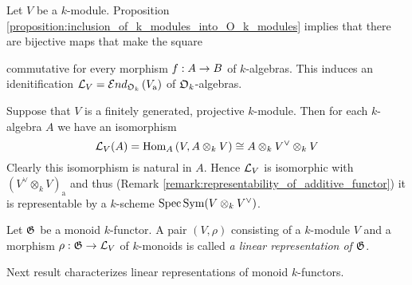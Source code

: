 \begin{remark}\label{remark:general_linear_monoid}
Let $V$ be a $k$-module. Proposition \ref{proposition:inclusion_of_k_modules_into_O_k_modules} implies that there are bijective maps that make the square
\begin{center}
\end{center}
commutative for every morphism $f:A\rightarrow B$ of $k$-algebras. This induces an idenitification ${\mathcal L}_V = {\mathcal E} nd_{{\mathfrak O}_k}\left(V_{\mathrm{a}}\right)$ of ${\mathfrak O}_k$-algebras.
\end{remark}

\begin{remark}\label{remark:representability_of_linear_monoid}
Suppose that $V$ is a finitely generated, projective $k$-module. Then for each $k$-algebra $A$ we have an isomorphism
$${\mathcal L}_V(A) = \mathrm{Hom}_A\left(V,A\otimes_kV\right) \cong A\otimes_kV^{\vee}\otimes_kV$$
Clearly this isomorphism is natural in $A$. Hence ${\mathcal L}_V$ is isomorphic with $\left(V^{\vee}\otimes_kV\right)_{\mathrm{a}}$ and thus (Remark \ref{remark:representability_of_additive_functor}) it is representable by a $k$-scheme $\mathrm{Spec}\, \textrm{Sym}(V\otimes_kV^{\vee})$.
\end{remark}

\begin{definition}
Let ${\mathfrak G}$ be a monoid $k$-functor. A pair $\left(V,\rho\right)$ consisting of a $k$-module $V$ and a morphism $\rho:{\mathfrak G}\rightarrow {\mathcal L}_V$ of $k$-monoids is called \textit{a linear representation of ${\mathfrak G}$}.
\end{definition}
\noindent
Next result characterizes linear representations of monoid $k$-functors.

